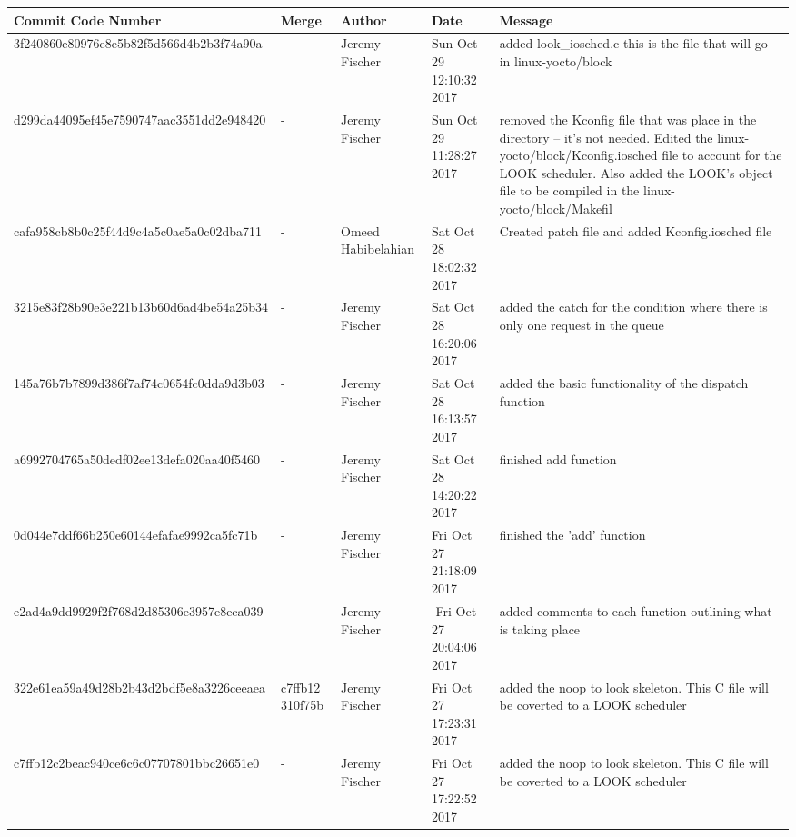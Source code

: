 \documentclass[draftclsnofoot, onecolumn, 10pt, compsoc]{IEEEtran}
\begin{document}
		\begin{tabular}{| p{6.8cm} | p{1.3cm} | p{2.5cm} | p{2cm} | p{4.2cm} |}
			\hline
			Commit Code Number & Merge & Author & Date & Message \\ \hline

			3f240860e80976e8e5b82f5d566d4b2b3f74a90a
			& -
			& Jeremy Fischer
			& Sun Oct 29 12:10:32 2017
			& added look\_iosched.c this is the file that will go in linux-yocto/block \\
			\hline

			d299da44095ef45e7590747aac3551dd2e948420
			& -
			& Jeremy Fischer
			& Sun Oct 29 11:28:27 2017
			& removed the Kconfig file that was place in the directory -- it's not needed. Edited the linux-yocto/block/Kconfig.iosched file to account for the LOOK scheduler. Also added the LOOK's object file to be compiled in the linux-yocto/block/Makefil \\
			\hline

			cafa958cb8b0c25f44d9c4a5c0ae5a0c02dba711
			& -
			& Omeed Habibelahian
			& Sat Oct 28 18:02:32 2017
			& Created patch file and added Kconfig.iosched file \\
			\hline

			3215e83f28b90e3e221b13b60d6ad4be54a25b34
			& -
			& Jeremy Fischer
			& Sat Oct 28 16:20:06 2017
			& added the catch for the condition where there is only one request in the queue \\
			\hline

			145a76b7b7899d386f7af74c0654fc0dda9d3b03
			& -
			& Jeremy Fischer
			& Sat Oct 28 16:13:57 2017
			& added the basic functionality of the dispatch function \\
			\hline

			a6992704765a50dedf02ee13defa020aa40f5460
			& - 
			& Jeremy Fischer
			& Sat Oct 28 14:20:22 2017
			& finished add function \\
			\hline

			0d044e7ddf66b250e60144efafae9992ca5fc71b
			& -
			& Jeremy Fischer
			& Fri Oct 27 21:18:09 2017
    			& finished the 'add' function \\
			\hline

			e2ad4a9dd9929f2f768d2d85306e3957e8eca039
			& -
			& Jeremy Fischer
			& -Fri Oct 27 20:04:06 2017
			& added comments to each function outlining what is taking place \\
			\hline

			322e61ea59a49d28b2b43d2bdf5e8a3226ceeaea
			& c7ffb12 310f75b
			& Jeremy Fischer
			& Fri Oct 27 17:23:31 2017
			& added the noop to look skeleton. This C file will be coverted to a LOOK scheduler \\
			\hline
			
			c7ffb12c2beac940ce6c6c07707801bbc26651e0
			& -
			& Jeremy Fischer
			& Fri Oct 27 17:22:52 2017
			& added the noop to look skeleton. This C file will be coverted to a LOOK scheduler \\
			\hline
		\end{tabular}
		
\end{document}
